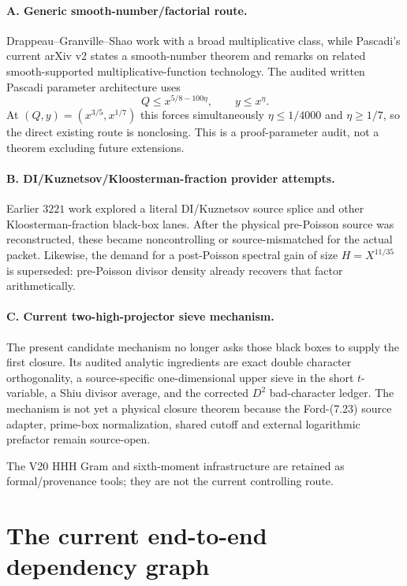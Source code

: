 \documentclass[11pt]{article}
\theoremstyle{definition}
\newcommand{\1}{\mathbf 1}
\begin{document}
\paragraph{A. Generic smooth-number/factorial route.}
Drappeau--Granville--Shao work with a broad multiplicative class, while Pascadi's current
arXiv v2 states a smooth-number theorem and remarks on related smooth-supported
multiplicative-function technology.  The audited written Pascadi parameter architecture
uses
\[
Q\le x^{5/8-100\eta},\qquad y\le x^\eta.
\]
At $(Q,y)=(x^{3/5},x^{1/7})$ this forces simultaneously
$\eta\le1/4000$ and $\eta\ge1/7$, so the direct existing route is nonclosing.  This is a
proof-parameter audit, not a theorem excluding future extensions.

\paragraph{B. DI/Kuznetsov/Kloosterman-fraction provider attempts.}
Earlier $3221$ work explored a literal DI/Kuznetsov source splice and other
Kloosterman-fraction black-box lanes.  After the physical pre-Poisson source was
reconstructed, these became noncontrolling or source-mismatched for the actual packet.
Likewise, the demand for a post-Poisson spectral gain of size $H=X^{11/35}$ is superseded:
pre-Poisson divisor density already recovers that factor arithmetically.

\paragraph{C. Current two-high-projector sieve mechanism.}
The present candidate mechanism no longer asks those black boxes to supply the first
closure.  Its audited analytic ingredients are exact double character orthogonality, a
source-specific one-dimensional upper sieve in the short $t$-variable, a Shiu divisor
average, and the corrected $D^2$ bad-character ledger.  The mechanism is not yet a physical
closure theorem because the Ford-(7.23) source adapter, prime-box normalization, shared
cutoff and external logarithmic prefactor remain source-open.

The V20 HHH Gram and sixth-moment infrastructure are retained as formal/provenance tools;
they are not the current controlling route.


\section{The current end-to-end dependency graph}
\end{document}
